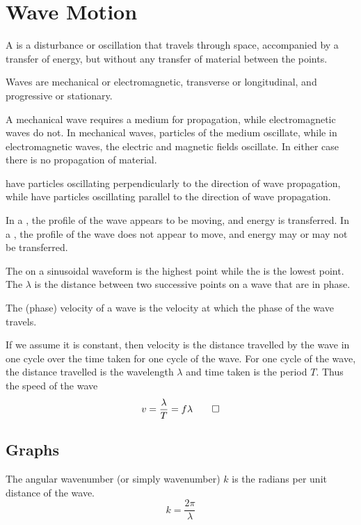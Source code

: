 \documentclass[Physics.tex]{subfiles}
\begin{document}
\chapter{Wave Motion}
A  is a disturbance or oscillation that travels through space, accompanied by a transfer of energy, but without any transfer of material between the points.

Waves are mechanical or electromagnetic, transverse or longitudinal, and progressive or stationary.

A mechanical wave requires a medium for propagation, while electromagnetic waves do not. In mechanical waves, particles of the medium oscillate, while in electromagnetic waves, the electric and magnetic fields oscillate. In either case there is no propagation of material.

 have particles oscillating perpendicularly to the direction of wave propagation, while  have particles oscillating parallel to the direction of wave propagation.

In a , the profile of the wave appears to be moving, and energy is transferred. In a , the profile of the wave does not appear to move, and energy may or may not be transferred.

The  on a sinusoidal waveform is the highest point while the  is the lowest point. The  \(\lambda\) is the distance between two successive points on a wave that are in phase.

The (phase) velocity of a wave is the velocity at which the phase of the wave travels. \begin{slderiv}If we assume it is constant, then velocity is the distance travelled by the wave in one cycle over the time taken for one cycle of the wave. For one cycle of the wave, the distance travelled is the wavelength \(\lambda\) and time taken is the period \(T\). Thus the speed of the wave \begin{equation}v = \frac{\lambda}{T} = f\lambda\qedhere\end{equation}\end{slderiv}
\section{Graphs}
The angular wavenumber (or simply wavenumber) \(k\) is the radians per unit distance of the wave. \[k = \frac{2\pi}{\lambda}\]
\end{document}
